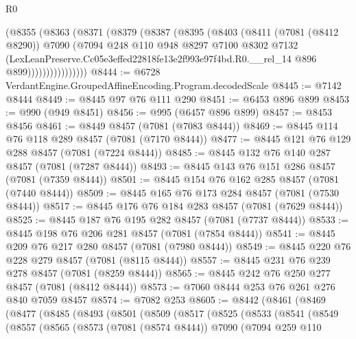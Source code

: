 \begin{lexlean}{R0}
\begin{coremodule}
                (@8355
                  (@8363
                    (@8371
                      (@8379
                        (@8387
                          (@8395
                            (@8403
                              (@8411
                                (@7081 (@8412 @8290))
                                @7090
                                (@7094
                                  @248
                                  @110
                                  @948
                                  @8297
                                  @7100
                                  @8302
                                  @7132
                                  (LexLeanPreserve.Cc05e3effed22818fe13e2f993e97f4bd.R0.__rel_14
                                    @896
                                    @899))))))))))))))))
@8444 := @6728 VerdantEngine.GroupedAffineEncoding.Program.decodedScale
@8445 := @7142 @8444
@8449 := @8445 @97 @76 @111 @290
@8451 := @6453 @896 @899
@8453 := @990 (@949 @8451)
@8456 := @995 (@6457 @896 @899)
@8457 := @8453 @8456
@8461 := @8449 @8457 (@7081 (@7083 @8444))
@8469 := @8445 @114 @76 @118 @289 @8457 (@7081 (@7170 @8444))
@8477 := @8445 @121 @76 @129 @288 @8457 (@7081 (@7224 @8444))
@8485 := @8445 @132 @76 @140 @287 @8457 (@7081 (@7287 @8444))
@8493 := @8445 @143 @76 @151 @286 @8457 (@7081 (@7359 @8444))
@8501 := @8445 @154 @76 @162 @285 @8457 (@7081 (@7440 @8444))
@8509 := @8445 @165 @76 @173 @284 @8457 (@7081 (@7530 @8444))
@8517 := @8445 @176 @76 @184 @283 @8457 (@7081 (@7629 @8444))
@8525 := @8445 @187 @76 @195 @282 @8457 (@7081 (@7737 @8444))
@8533 := @8445 @198 @76 @206 @281 @8457 (@7081 (@7854 @8444))
@8541 := @8445 @209 @76 @217 @280 @8457 (@7081 (@7980 @8444))
@8549 := @8445 @220 @76 @228 @279 @8457 (@7081 (@8115 @8444))
@8557 := @8445 @231 @76 @239 @278 @8457 (@7081 (@8259 @8444))
@8565 := @8445 @242 @76 @250 @277 @8457 (@7081 (@8412 @8444))
@8573 := @7060 @8444 @253 @76 @261 @276 @840 @7059 @8457
@8574 := @7082 @253
@8605 := @8442
    (@8461
      (@8469
        (@8477
          (@8485
            (@8493
              (@8501
                (@8509
                  (@8517
                    (@8525
                      (@8533
                        (@8541
                          (@8549
                            (@8557
                              (@8565
                                (@8573
                                  (@7081 (@8574 @8444))
                                  @7090
                                  (@7094
                                    @259
                                    @110

\end{coremodule}
\end{lexlean}
